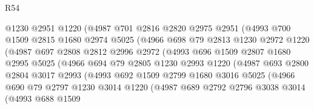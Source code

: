 \begin{lexlean}{R54}
\begin{coremodule}
                    @1230
                    @2951
                    @1220
                    (@4987
                      @701
                      @2816
                      @2820
                      @2975
                      @2951
                      (@4993
                        @700
                        @1509
                        @2815
                        @1680
                        @2974
                        @5025
                        (@4966
                          @698
                          @79
                          @2813
                          @1230
                          @2972
                          @1220
                          (@4987
                            @697
                            @2808
                            @2812
                            @2996
                            @2972
                            (@4993
                              @696
                              @1509
                              @2807
                              @1680
                              @2995
                              @5025
                              (@4966
                                @694
                                @79
                                @2805
                                @1230
                                @2993
                                @1220
                                (@4987
                                  @693
                                  @2800
                                  @2804
                                  @3017
                                  @2993
                                  (@4993
                                    @692
                                    @1509
                                    @2799
                                    @1680
                                    @3016
                                    @5025
                                    (@4966
                                      @690
                                      @79
                                      @2797
                                      @1230
                                      @3014
                                      @1220
                                      (@4987
                                        @689
                                        @2792
                                        @2796
                                        @3038
                                        @3014
                                        (@4993
                                          @688
                                          @1509

\end{coremodule}
\end{lexlean}
